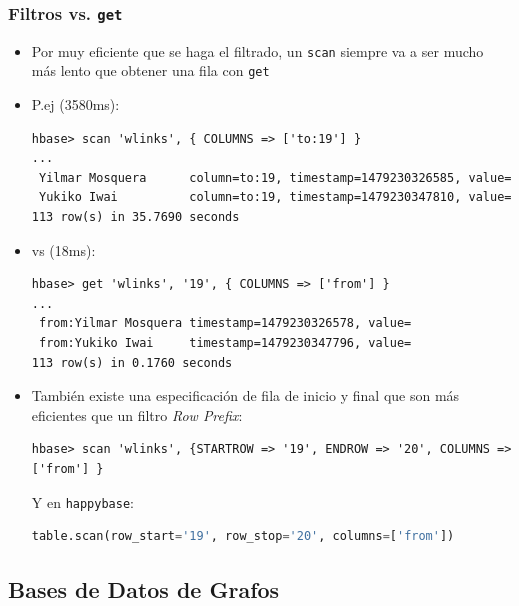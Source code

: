 \documentclass[14pt]{beamer}
\begin{document}
\begin{frame}
  \frametitle{Filtros vs. {\tt get}}
  \begin{itemize}
  \item Por muy eficiente que se haga el filtrado, un {\tt scan} siempre va
    a ser mucho más lento que obtener una fila con {\tt get}
  \item P.ej (3580ms):
\begin{lstlisting}
hbase> scan 'wlinks', { COLUMNS => ['to:19'] }
...
 Yilmar Mosquera      column=to:19, timestamp=1479230326585, value=
 Yukiko Iwai          column=to:19, timestamp=1479230347810, value=
113 row(s) in 35.7690 seconds
\end{lstlisting}

    \framebreak

  \item vs (18ms):
\begin{lstlisting}
hbase> get 'wlinks', '19', { COLUMNS => ['from'] }
...
 from:Yilmar Mosquera timestamp=1479230326578, value=
 from:Yukiko Iwai     timestamp=1479230347796, value=
113 row(s) in 0.1760 seconds
\end{lstlisting}

  \item También existe una especificación de fila de inicio y final que son
    más eficientes que un filtro {\em Row Prefix}:

\begin{lstlisting}
hbase> scan 'wlinks', {STARTROW => '19', ENDROW => '20', COLUMNS => ['from'] }
\end{lstlisting}

    Y en {\tt happybase}:

\begin{lstlisting}[language=Python]
table.scan(row_start='19', row_stop='20', columns=['from'])
\end{lstlisting}

  \end{itemize}
\end{frame}



\subsection{Bases de Datos de Grafos}
\end{document}
